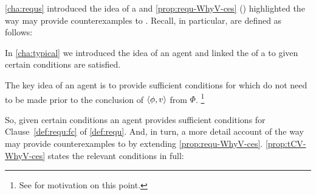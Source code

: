 \begin{note}
  \autoref{cha:requs} introduced the idea of a \requ{} and \autoref{prop:requ-WhyV-ces} () highlighted the way  may provide counterexamples to \issueInclusion{}.
  Recall, in particular,  are defined as follows:


  \noindent%
  In \autoref{cha:typical} we introduced the idea of an agent \tCV{} and linked the \tpro{} of a \torNa{} to  given certain conditions are satisfied.

  The key idea of an agent \tCV{} is to provide sufficient conditions for  which do not need to be made prior to the \agents{} conclusion of \(\langle\phi, v\rangle\) from \(\Phi\).%
  \footnote{
    See  for motivation on this point.
  }

  So, given certain conditions an agent \tCV{} provides sufficient conditions for Clause~\ref{def:requ:fc} of \autoref{def:requ}.
  And, in turn, a more detail account of the way  may provide counterexamples to \issueInclusion{} by extending \autoref{prop:requ-WhyV-ces}.
  \autoref{prop:tCV-WhyV-ces} states the relevant conditions in full:


\end{note}
